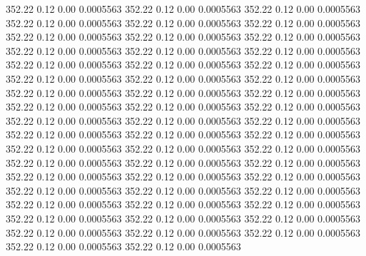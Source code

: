  352.22    0.12    0.00   0.0005563
 352.22    0.12    0.00   0.0005563
 352.22    0.12    0.00   0.0005563
 352.22    0.12    0.00   0.0005563
 352.22    0.12    0.00   0.0005563
 352.22    0.12    0.00   0.0005563
 352.22    0.12    0.00   0.0005563
 352.22    0.12    0.00   0.0005563
 352.22    0.12    0.00   0.0005563
 352.22    0.12    0.00   0.0005563
 352.22    0.12    0.00   0.0005563
 352.22    0.12    0.00   0.0005563
 352.22    0.12    0.00   0.0005563
 352.22    0.12    0.00   0.0005563
 352.22    0.12    0.00   0.0005563
 352.22    0.12    0.00   0.0005563
 352.22    0.12    0.00   0.0005563
 352.22    0.12    0.00   0.0005563
 352.22    0.12    0.00   0.0005563
 352.22    0.12    0.00   0.0005563
 352.22    0.12    0.00   0.0005563
 352.22    0.12    0.00   0.0005563
 352.22    0.12    0.00   0.0005563
 352.22    0.12    0.00   0.0005563
 352.22    0.12    0.00   0.0005563
 352.22    0.12    0.00   0.0005563
 352.22    0.12    0.00   0.0005563
 352.22    0.12    0.00   0.0005563
 352.22    0.12    0.00   0.0005563
 352.22    0.12    0.00   0.0005563
 352.22    0.12    0.00   0.0005563
 352.22    0.12    0.00   0.0005563
 352.22    0.12    0.00   0.0005563
 352.22    0.12    0.00   0.0005563
 352.22    0.12    0.00   0.0005563
 352.22    0.12    0.00   0.0005563
 352.22    0.12    0.00   0.0005563
 352.22    0.12    0.00   0.0005563
 352.22    0.12    0.00   0.0005563
 352.22    0.12    0.00   0.0005563
 352.22    0.12    0.00   0.0005563
 352.22    0.12    0.00   0.0005563
 352.22    0.12    0.00   0.0005563
 352.22    0.12    0.00   0.0005563
 352.22    0.12    0.00   0.0005563
 352.22    0.12    0.00   0.0005563
 352.22    0.12    0.00   0.0005563
 352.22    0.12    0.00   0.0005563
 352.22    0.12    0.00   0.0005563
 352.22    0.12    0.00   0.0005563
 352.22    0.12    0.00   0.0005563
 352.22    0.12    0.00   0.0005563
 352.22    0.12    0.00   0.0005563
